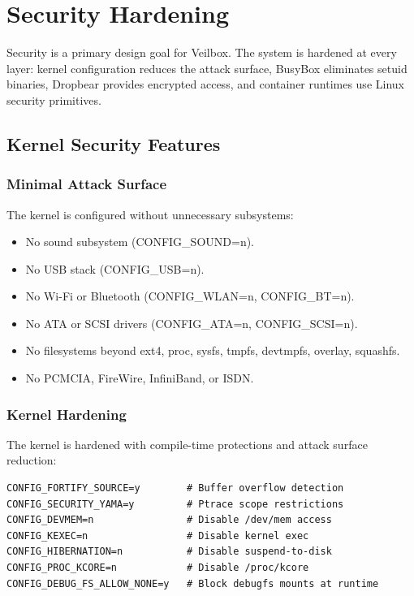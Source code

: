 \chapter{Security Hardening}
\label{ch:security}

Security is a primary design goal for Veilbox. The system is hardened at
every layer: kernel configuration reduces the attack surface, BusyBox
eliminates setuid binaries, Dropbear provides encrypted access, and
container runtimes use Linux security primitives.

\section{Kernel Security Features}

\subsection{Minimal Attack Surface}

The kernel is configured without unnecessary subsystems:
\begin{itemize}[nosep]
  \item No sound subsystem (CONFIG\_SOUND=n).
  \item No USB stack (CONFIG\_USB=n).
  \item No Wi-Fi or Bluetooth (CONFIG\_WLAN=n, CONFIG\_BT=n).
  \item No ATA or SCSI drivers (CONFIG\_ATA=n, CONFIG\_SCSI=n).
  \item No filesystems beyond ext4, proc, sysfs, tmpfs, devtmpfs,
        overlay, squashfs.
  \item No PCMCIA, FireWire, InfiniBand, or ISDN.
\end{itemize}

\subsection{Kernel Hardening}

The kernel is hardened with compile-time protections and attack surface reduction:

\begin{lstlisting}
CONFIG_FORTIFY_SOURCE=y        # Buffer overflow detection
CONFIG_SECURITY_YAMA=y         # Ptrace scope restrictions
CONFIG_DEVMEM=n                # Disable /dev/mem access
CONFIG_KEXEC=n                 # Disable kernel exec
CONFIG_HIBERNATION=n           # Disable suspend-to-disk
CONFIG_PROC_KCORE=n            # Disable /proc/kcore
CONFIG_DEBUG_FS_ALLOW_NONE=y   # Block debugfs mounts at runtime
\end{lstlisting}

